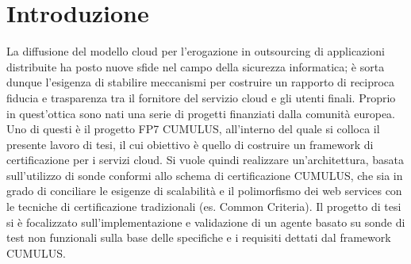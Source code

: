 \documentclass[../main.tex]{subfiles}
\begin{document}
\chapter{Introduzione}
La diffusione del modello cloud per l’erogazione in outsourcing di applicazioni distribuite ha posto nuove sfide
nel campo della sicurezza informatica; è sorta dunque l’esigenza di stabilire meccanismi per costruire un rapporto
di reciproca fiducia e trasparenza tra il fornitore del servizio cloud e gli utenti finali. Proprio in quest’ottica sono
nati una serie di progetti finanziati dalla comunità europea. Uno di questi è il progetto FP7 CUMULUS, all’interno
del quale si colloca il presente lavoro di tesi, il cui obiettivo è quello di costruire un framework di certificazione
per i servizi cloud. Si vuole quindi realizzare un’architettura, basata sull’utilizzo di sonde conformi allo schema di
certificazione CUMULUS, che sia in grado di conciliare le esigenze di scalabilità e il polimorfismo dei web services
con le tecniche di certificazione tradizionali (es. Common Criteria).
Il progetto di tesi si è focalizzato sull'implementazione e validazione di un agente basato su sonde di test non
funzionali sulla base delle specifiche e i requisiti dettati dal framework CUMULUS.
\end{document}
